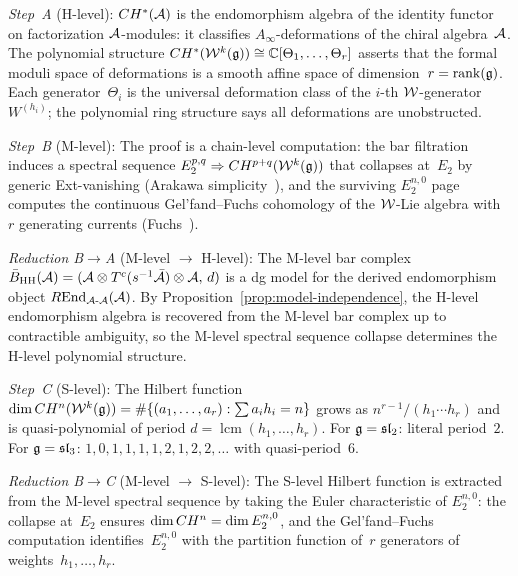 \begin{remark}
\label{rem:theorem-h-model}
\emph{Step~A} (H-level):
$CH^*(\mathcal{A})$ is the endomorphism algebra of the
identity functor on factorization $\mathcal{A}$-modules: it classifies
$A_\infty$-deformations of the chiral algebra~$\mathcal{A}$.
The polynomial structure
$CH^*(\mathcal{W}^k(\mathfrak{g})) \cong \mathbb{C}[\Theta_1,\ldots,\Theta_r]$
asserts that the formal moduli space of deformations is a smooth
affine space of dimension~$r = \operatorname{rank}(\mathfrak{g})$.
Each generator~$\Theta_i$ is the universal deformation class
of the $i$-th $\mathcal{W}$-generator $W^{(h_i)}$; the polynomial
ring structure says all deformations are unobstructed.

\emph{Step~B} (M-level):
The proof is a chain-level computation: the bar filtration
induces a spectral sequence
$E_2^{p,q} \Rightarrow CH^{p+q}(\mathcal{W}^k(\mathfrak{g}))$
that collapses at~$E_2$ by generic Ext-vanishing (Arakawa
simplicity~\cite{Ara07}), and the surviving $E_2^{n,0}$ page
computes the continuous Gel'fand--Fuchs cohomology of the
$\mathcal{W}$-Lie algebra with~$r$ generating currents
(Fuchs~\cite{Fuks86}).

\emph{Reduction B$\to$A} (M-level $\to$ H-level):
The M-level bar complex
$\bar{B}_{\mathrm{HH}}(\mathcal{A}) = (\mathcal{A} \otimes T^c(s^{-1}\bar{\mathcal{A}})
\otimes \mathcal{A},\, d)$ is a dg model for the derived endomorphism
object $R\!\operatorname{End}_{\mathcal{A}\text{-}\mathcal{A}}(\mathcal{A})$.
By Proposition~\ref{prop:model-independence}, the H-level
endomorphism algebra is recovered from the M-level bar complex
up to contractible ambiguity, so the M-level spectral sequence
collapse determines the H-level polynomial structure.

\emph{Step~C} (S-level):
The Hilbert function
$\dim CH^n(\mathcal{W}^k(\mathfrak{g}))
= \#\{(a_1,\ldots,a_r) : \sum a_i h_i = n\}$
grows as $n^{r-1}/(h_1 \cdots h_r)$ and is quasi-polynomial of
period $d = \operatorname{lcm}(h_1,\ldots,h_r)$.
For $\mathfrak{g} = \mathfrak{sl}_2$: literal period~$2$.
For $\mathfrak{g} = \mathfrak{sl}_3$: $1,0,1,1,1,1,2,1,2,2,\ldots$
with quasi-period~$6$.

\emph{Reduction B$\to$C} (M-level $\to$ S-level):
The S-level Hilbert function is extracted from the M-level
spectral sequence by taking the Euler characteristic of
$E_2^{n,0}$: the collapse at~$E_2$ ensures
$\dim CH^n = \dim E_2^{n,0}$, and the Gel'fand--Fuchs
computation identifies~$E_2^{n,0}$ with the partition function
of~$r$ generators of weights~$h_1,\ldots,h_r$.
\end{remark}

